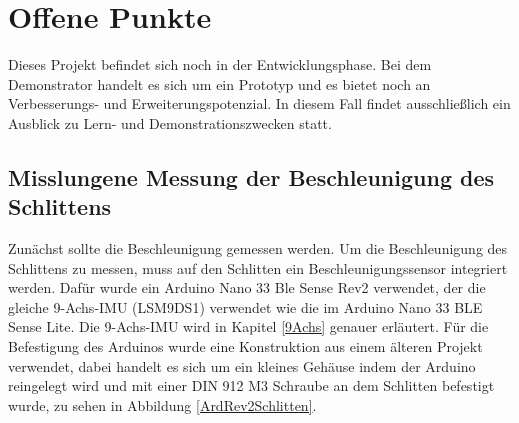 %
%
%

\chapter{Offene Punkte}

Dieses Projekt befindet sich noch in der Entwicklungsphase. Bei dem Demonstrator handelt es sich um ein Prototyp und es bietet noch an Verbesserungs- und Erweiterungspotenzial. In diesem Fall findet ausschließlich ein Ausblick zu Lern- und Demonstrationszwecken statt. 

\section{Misslungene Messung der Beschleunigung des Schlittens}

Zunächst sollte die Beschleunigung gemessen werden. Um die Beschleunigung des Schlittens zu messen, muss auf den Schlitten ein Beschleunigungssensor integriert werden. Dafür wurde ein Arduino Nano 33 Ble Sense Rev2 verwendet, der die gleiche 9-Achs-IMU (LSM9DS1) verwendet wie die im Arduino Nano 33 BLE Sense Lite. Die 9-Achs-IMU wird in Kapitel \ref{9Achs} genauer erläutert. Für die Befestigung des Arduinos wurde eine Konstruktion aus einem älteren Projekt verwendet, dabei handelt es sich um ein kleines Gehäuse indem der Arduino reingelegt wird und mit einer DIN 912 M3 Schraube an dem Schlitten befestigt wurde, zu sehen in Abbildung \ref{ArdRev2Schlitten}.

